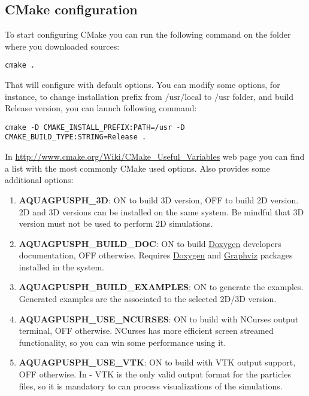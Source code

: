 \subsection{CMake configuration}
\label{sss:install:cmake}
%
To start configuring CMake you can run the following command on the folder 
where you downloaded \NAME sources:
%
\begin{verbatim}
cmake .
\end{verbatim}
%
That will configure \NAME with default options. You can modify some options, 
for instance, to change installation prefix from $\mbox{/usr/local}$ to 
$\mbox{/usr}$ folder, and build Release version, you can launch following 
command:
%
\begin{verbatim}
cmake -D CMAKE_INSTALL_PREFIX:PATH=/usr -D CMAKE_BUILD_TYPE:STRING=Release .
\end{verbatim}
%
In \url{http://www.cmake.org/Wiki/CMake_Useful_Variables} web page you can 
find a list with the most commonly CMake used options. Also \NAME provides 
some additional options:
%
\begin{enumerate}
	\item \textbf{AQUAGPUSPH\_3D}: ON to build 3D \NAME version, OFF to build 
	2D version. \NAME 2D and 3D versions can be installed on the same system. 
	Be mindful that 3D version must not be used to perform 2D simulations.
	\item \textbf{AQUAGPUSPH\_BUILD\_DOC}: ON to build 
	\href{http://www.doxygen.org}{Doxygen} developers documentation, OFF 
	otherwise. Requires \href{http://www.doxygen.org}{Doxygen} and 
	\href{www.graphviz.org}{Graphviz} packages installed in the system.
	\item \textbf{AQUAGPUSPH\_BUILD\_EXAMPLES}: ON to generate the examples. 
	Generated examples are the associated to the selected 2D/3D version.
	\item \textbf{AQUAGPUSPH\_USE\_NCURSES}: ON to build \NAME with NCurses 
	output terminal, OFF otherwise. NCurses has more efficient screen streamed 
	functionality, so you can win some performance using it.
	\item \textbf{AQUAGPUSPH\_USE\_VTK}: ON to build \NAME with VTK output 
	support, OFF otherwise. In \NAME- \VERSION VTK is the only valid output 
	format for the particles files, so it is mandatory to can process 
	visualizations of the simulations.
\end{enumerate}
%
